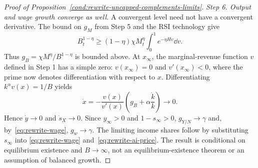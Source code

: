 \begin{proof}[Proof of Proposition~\ref{cond:rewrite-uncapped-complements-limits}]
\textit{Step 6. Output and wage growth converge as well.}
A convergent level need not have a convergent derivative.
The bound on $g_M$ from Step 5 and the RSI technology give
\[
 B_t^{1-\eta}
 \geq(1-\eta)\chi M_t^\eta\int_0^1e^{-\eta H v}\dd v.
\]
Thus $g_B=\chi M^\eta/B^{1-\eta}$ is bounded above.
At $x_\infty$, the marginal-revenue function $v$ defined in Step 1 has
a simple zero: $v(x_\infty)=0$ and $v'(x_\infty)<0$, where the prime
now denotes differentiation with respect to $x$.
Differentiating $k^\alpha v(x)=1/B$ yields
\[
 \dot x=-\frac{v(x)}{v'(x)}
 \left(g_B+\alpha\frac{\dot k}{k}\right)\longrightarrow0.
\]
Hence $\dot y\to0$ and $\dot s_X\to0$.
Since $y_\infty>0$ and $1-s_\infty>0$, $g_{Y/N}\to\gamma$ and,
by~\eqref{eq:rewrite-wage}, $g_w\to\gamma$.
The limiting income shares follow by substituting $s_\infty$ into
\eqref{eq:rewrite-wage} and~\eqref{eq:rewrite-ai-price}.
The result is conditional on equilibrium existence and $B\to\infty$,
not an equilibrium-existence theorem or an assumption of balanced growth.
\end{proof}

